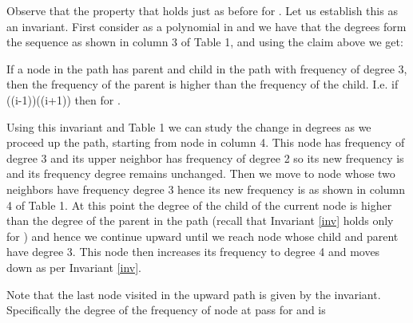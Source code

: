Observe that the property that  holds just as before for .
Let us establish this as an invariant. First consider   as a polynomial in  and we have
that the degrees form the sequence  as shown in column 3 of Table 1, and using
the claim above we get:
\begin{invariant}\label{inv}
If a node in the path has parent and child in the path with frequency of degree 3, then
the frequency of the parent is higher than the frequency of the child. I.e. if
((i-1))((i+1))  then  for .
\end{invariant}
Using this invariant and Table 1 we can study the change in degrees as we proceed up the path, starting from node  in column 4.
This node has frequency of degree 3 and its upper neighbor has frequency of
degree 2 so its new frequency is  and its
frequency degree remains unchanged. Then we move to node  whose
two neighbors have frequency degree 3 hence its new frequency
is  as shown in column 4 of Table 1. At this point the degree of the child of the current node is higher than the degree
of the parent in the path (recall that Invariant \ref{inv} holds only for ) and hence we continue upward until we reach node  whose
child and parent have degree 3. This node then increases its frequency to degree 4 and moves
down as per Invariant \ref{inv}.

\noindent Note that the last node visited in the upward path is given by the invariant. Specifically the degree of
the frequency of node  at pass  for  and  is
{\small

}

